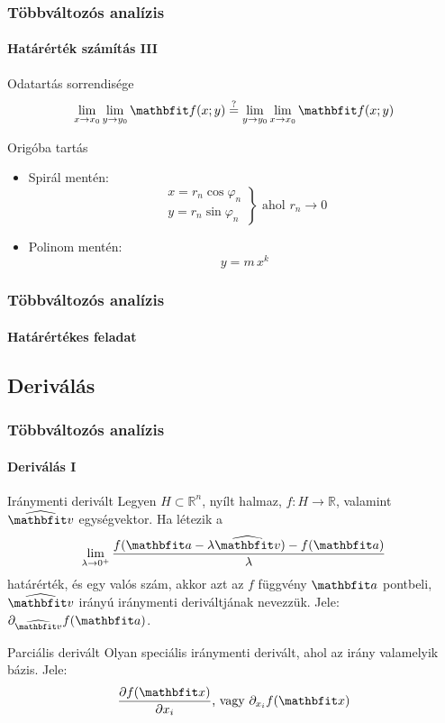\begin{frame}
  \frametitle{Többváltozós analízis}
  \framesubtitle{Határérték számítás III}

  \begin{block}{Odatartás sorrendisége}
    \[
      \lim_{x \rightarrow x_0}
      \lim_{y \rightarrow y_0}
      \rvec f(x; y)
      \overset{?}{=}
      \lim_{y \rightarrow y_0}
      \lim_{x \rightarrow x_0}
      \rvec f(x; y)
    \]
  \end{block}

  \begin{block}{Origóba tartás}
    \begin{itemize}
      \item Spirál mentén:
            \[
              \left.
              \begin{array}{c}
                x = r_n \cos \varphi_n \\
                y = r_n \sin \varphi_n
              \end{array}
              \right\}
              \text{ ahol }
              r_n \rightarrow 0
            \]
      \item Polinom mentén: \[
              y = m \,x^k
            \]
    \end{itemize}
  \end{block}
\end{frame}

\begin{frame}
  \frametitle{Többváltozós analízis}
  \framesubtitle{Határértékes feladat}

  
\end{frame}

\subsection{Deriválás}

\begin{frame}
  \frametitle{Többváltozós analízis}
  \framesubtitle{Deriválás I}

  \begin{block}{Iránymenti derivált}
    Legyen $H \subset \mathbb R^n$, nyílt halmaz, $f: H \rightarrow \mathbb R$,
    valamint $\uvec v$ egységvektor. Ha létezik a
    \[
      \lim_{\lambda \rightarrow 0^+}
      \frac{f(\rvec a - \lambda \uvec v) - f(\rvec a)}{\lambda}
    \]
    határérték, és egy valós szám, akkor azt az $f$ függvény $\rvec a$ pontbeli,
    $\uvec v$ irányú iránymenti deriváltjának nevezzük.
    Jele: $\partial_{\uvec v} f(\rvec a)$.
  \end{block}

  \begin{block}{Parciális derivált}
    Olyan speciális iránymenti derivált, ahol az irány valamelyik bázis. Jele:
    \[
      \pdv{f(\rvec x)}{x_i}
      \text{, vagy }
      \partial_{x_i} f(\rvec x)
    \]
  \end{block}
\end{frame}

